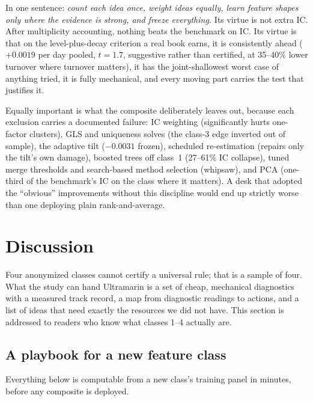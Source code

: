 \documentclass[11pt]{article}
\begin{document}
In one sentence: \emph{count each idea once, weight ideas equally, learn feature shapes
only where the evidence is strong, and freeze everything.} Its virtue is not extra IC.
After multiplicity accounting, nothing beats the benchmark on IC. Its virtue is that on
the level-plus-decay criterion a real book earns, it is consistently ahead
($+0.0019$ per day pooled, $t=1.7$, suggestive rather than certified, at 35--40\% lower
turnover where turnover matters), it has the joint-shallowest worst case of anything
tried, it is fully mechanical, and every moving part carries the test that justifies it.

Equally important is what the composite deliberately leaves out, because each exclusion
carries a documented failure: IC weighting (significantly hurts one-factor clusters),
GLS and uniqueness solves (the class-3 edge inverted out of sample), the adaptive tilt
($-0.0031$ frozen), scheduled re-estimation (repairs only the tilt's own damage), boosted
trees off class~1 (27--61\% IC collapse), tuned merge thresholds and search-based method
selection (whipsaw), and PCA (one-third of the benchmark's IC on the class where it
matters). A desk that adopted the ``obvious'' improvements without this discipline would
end up strictly worse than one deploying plain rank-and-average.

\FloatBarrier
\section{Discussion}
\label{sec:discussion}

Four anonymized classes cannot certify a universal rule; that is a sample of four. What
the study can hand Ultramarin is a set of cheap, mechanical diagnostics with a measured
track record, a map from diagnostic readings to actions, and a list of ideas that need
exactly the resources we did not have. This section is addressed to readers who know
what classes 1--4 actually are.

\subsection{A playbook for a new feature class}
\label{sec:discussion-playbook}

Everything below is computable from a new class's training panel in minutes, before any
composite is deployed.
\end{document}
